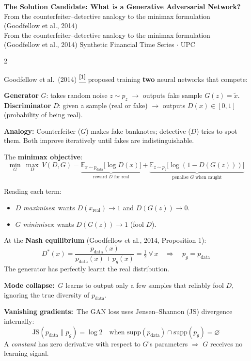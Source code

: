 \documentclass[10pt]{article}
\newcommand{\navybox}[2]{\begin{tcolorbox}[mybox={Navy}{LBg},title={#1}]#2\end{tcolorbox}}
\newcommand{\redbox}[2]{\begin{tcolorbox}[mybox={DRed}{RBg},title={#1}]#2\end{tcolorbox}}
\newcommand{\pagehead}[2]{%
  \begin{tcolorbox}[enhanced,arc=0pt,outer arc=0pt,boxrule=0pt,
    colback=Navy,colframe=Navy,
    top=5pt,bottom=5pt,left=8pt,right=8pt,
    before skip=0pt,after skip=10pt]
  {\color{white}\large\bfseries #1}%
  \ifx\relax#2\relax\else\\[1pt]{\color{blue!30!white}\small #2}\fi
  \hfill{\color{blue!20!white}\footnotesize Synthetic Financial Time Series $\cdot$ UPC}
  \end{tcolorbox}}
\newcommand{\tcite}[1]{%
  \hyperlink{R:#1}{\textsuperscript{\scriptsize\textbf{[#1]}}}}
\newcommand{\E}{\mathbb{E}}
\begin{document}
\pagehead{The Solution Candidate: What is a Generative Adversarial Network?}
         {From the counterfeiter--detective analogy to the minimax formulation (Goodfellow et al., 2014)}

\begin{multicols}{2}

\navybox{The Core Idea --- A Two-Player Game}{%
Goodfellow et al.\ (2014)\tcite{1} proposed training \textbf{two} neural networks that compete:

\smallskip
\textbf{Generator} $G$: takes random noise $z \sim p_z$ $\to$ outputs fake sample $G(z) = \tilde{x}$.
\textbf{Discriminator} $D$: given a sample (real or fake) $\to$ outputs $D(x) \in [0,1]$ (probability of being real).

\smallskip
\textbf{Analogy:} Counterfeiter ($G$) makes fake banknotes; detective ($D$) tries to spot them.
Both improve iteratively until fakes are indistinguishable.

\smallskip
The \textbf{minimax objective}:
\begin{equation*}
  \min_G\ \max_D\ V(D,G) =
  \underbrace{\E_{x \sim p_\text{data}}\!\bigl[\log D(x)\bigr]}_{\text{reward } D \text{ for real}}
  +
  \underbrace{\E_{z \sim p_z}\!\bigl[\log(1 - D(G(z)))\bigr]}_{\text{penalise } G \text{ when caught}}
\end{equation*}

Reading each term:
\begin{itemize}
  \item $D$ \emph{maximises}: wants $D(x_\text{real}) \to 1$ and $D(G(z)) \to 0$.
  \item $G$ \emph{minimises}: wants $D(G(z)) \to 1$ (fool $D$).
\end{itemize}

At the \textbf{Nash equilibrium} (Goodfellow et al., 2014, Proposition 1):
\begin{equation*}
  D^*(x) = \frac{p_\text{data}(x)}{p_\text{data}(x)+p_g(x)} = \tfrac{1}{2}\ \forall\,x
  \quad\Longrightarrow\quad p_g = p_\text{data}
\end{equation*}
The generator has perfectly learnt the real distribution.}

\redbox{Critical Problem: Vanishing Gradients \& Mode Collapse}{%
\textbf{Mode collapse:}\ $G$ learns to output only a few samples that reliably fool $D$, ignoring the true diversity of $p_\text{data}$.

\textbf{Vanishing gradients:}\ The GAN loss uses Jensen--Shannon (JS) divergence internally:
\begin{equation*}
  \text{JS}(p_\text{data} \| p_g) = \log 2 \quad\text{when } \text{supp}(p_\text{data}) \cap \text{supp}(p_g) = \varnothing
\end{equation*}
A \textit{constant} has zero derivative with respect to $G$'s parameters $\Rightarrow$ $G$ receives no learning signal.

}
\end{multicols}
\end{document}
